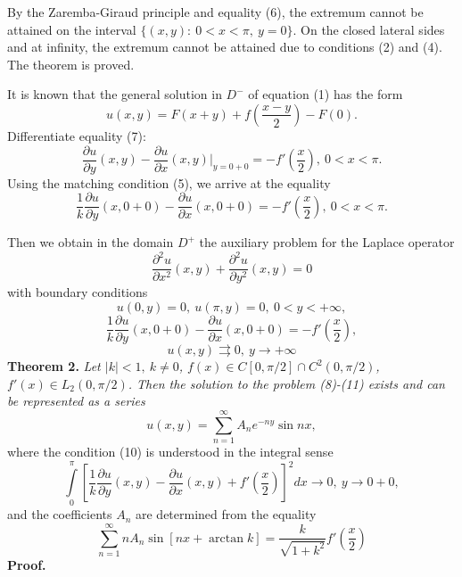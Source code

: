 \documentclass[9pt]{article}
\begin{document}
	By the Zaremba-Giraud principle and equality (6), the extremum cannot be attained on the interval $\{(x,y):\ 0 < x < \pi, \ y = 0\}$. On the closed lateral sides and at infinity, the extremum cannot be attained due to conditions (2) and (4). The theorem is proved.
	
	It is known that the general solution in $D^{-}$ of equation (1) has the form
	\begin{equation}
		u(x,y) = F(x+y) + f(\dfrac{x-y}{2}) - F(0).
	\end{equation}
	Differentiate equality (7):
	\begin{equation*}
		\dfrac{\partial u}{\partial y}(x,y) - \dfrac{\partial u}{\partial x}(x,y) \vert_{y=0+0} = -f'\left(\dfrac{x}2\right), \ 0 < x < \pi.
	\end{equation*}
	Using the matching condition (5), we arrive at the equality
	\begin{equation*}
		\dfrac{1}{k} \dfrac{\partial u}{\partial y}(x, 0+0) - \dfrac{\partial u}{\partial x}(x, 0 + 0) = - f'\left(\dfrac{x}2\right), \ 0 < x < \pi.
	\end{equation*}
	
	Then we obtain in the domain $D^{+}$ the auxiliary problem for the Laplace operator
	\begin{equation}
		\dfrac{\partial^2 u}{\partial x^2}(x,y) + \dfrac{\partial^2 u}{\partial y^2}(x,y) = 0
	\end{equation}
	with boundary conditions
	\begin{equation}
		u(0,y) = 0, \ u(\pi, y) = 0, \ 0 < y < +\infty,
	\end{equation}
	\begin{equation}
		\dfrac{1}{k} \dfrac{\partial u}{\partial y}(x,0+0) - \dfrac{\partial u}{\partial x}(x,0+0) = -f'\left(\dfrac{x}{2}\right),
	\end{equation}
	\begin{equation}
		u(x,y) \rightrightarrows 0, \ y \to +\infty
	\end{equation}
	\textbf{Theorem 2.} \textit{Let $|k| < 1, \ k \neq 0$, $f(x) \in C[0, \pi/2] \cap C^2(0, \pi/2)$, $f'(x) \in L_2(0, \pi/2)$. Then the solution to the problem (8)-(11) exists and can be represented as a series
		\begin{equation}
			u(x,y) = \sum\limits_{n=1}^{\infty} A_n e^{-ny} \sin{nx},
	\end{equation}}
	where the condition (10) is understood in the integral sense
	\begin{equation*}
		\int\limits_0^\pi \left[	\dfrac{1}{k} \dfrac{\partial u}{\partial y}(x,y) - \dfrac{\partial u}{\partial x}(x,y) + f'\left(\dfrac{x}{2}\right)\right]^2 dx \to 0, \ y \to 0 + 0,
	\end{equation*}
	and the coefficients $A_n$ are determined from the equality
	\begin{equation}
		\sum\limits_{n=1}^{\infty} n A_n \sin{\left[nx + \arctan{k}\right]} = \dfrac{k}{\sqrt{1 + k^2}} f'\left(\dfrac{x}{2}\right)
	\end{equation}
	\textbf{Proof.}
	
\end{document}
